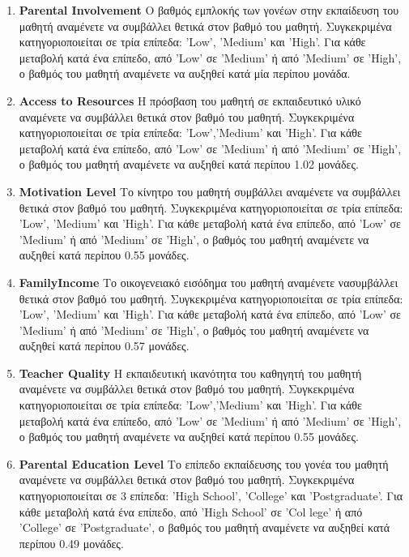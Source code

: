 \documentclass[12pt]{article}
\begin{document}
\begin{enumerate}
    \item \textbf{Parental Involvement} Ο βαθμός εμπλοκής των γονέων στην εκπαίδευση του μαθητή αναμένετε
 να συμβάλλει θετικά στον βαθμό του μαθητή. Συγκεκριμένα κατηγοριοποιείται σε τρία επίπεδα:
 ’Low’, ’Medium’ και ’High’. Για κάθε μεταβολή κατά ένα επίπεδο, από ’Low’ σε ’Medium’ ή
 από ’Medium’ σε ’High’, ο βαθμός του μαθητή αναμένετε να αυξηθεί κατά μία περίπου μονάδα.
 
 	\item \textbf{Access to Resources} Η πρόσβαση του μαθητή σε εκπαιδευτικό υλικό αναμένετε να συμβάλλει
 θετικά στον βαθμό του μαθητή. Συγκεκριμένα κατηγοριοποιείται σε τρία επίπεδα: ’Low’,’Medium’
 και ’High’. Για κάθε μεταβολή κατά ένα επίπεδο, από ’Low’ σε ’Medium’ ή από ’Medium’ σε
 ’High’, ο βαθμός του μαθητή αναμένετε να αυξηθεί κατά περίπου 1.02 μονάδες.
 
 \item \textbf{Motivation Level} Το κίνητρο του μαθητή συμβάλλει αναμένετε να συμβάλλει θετικά στον βαθμό
 του μαθητή. Συγκεκριμένα κατηγοριοποιείται σε τρία επίπεδα: ’Low’, ’Medium’ και ’High’. Για
 κάθε μεταβολή κατά ένα επίπεδο, από ’Low’ σε ’Medium’ ή από ’Medium’ σε ’High’, ο βαθμός
 του μαθητή αναμένετε να αυξηθεί κατά περίπου 0.55 μονάδες.
 
 \item \textbf{FamilyIncome} Το οικογενειακό εισόδημα του μαθητή αναμένετε νασυμβάλλει θετικά στον βαθμό
 του μαθητή. Συγκεκριμένα κατηγοριοποιείται σε τρία επίπεδα: ’Low’, ’Medium’ και ’High’. Για
 κάθε μεταβολή κατά ένα επίπεδο, από ’Low’ σε ’Medium’ ή από ’Medium’ σε ’High’, ο βαθμός
 του μαθητή αναμένετε να αυξηθεί κατά περίπου 0.57 μονάδες.
 
 \item \textbf{Teacher Quality} Η εκπαιδευτική ικανότητα του καθηγητή του μαθητή αναμένετε να συμβάλλει
 θετικά στον βαθμό του μαθητή. Συγκεκριμένα κατηγοριοποιείται σε τρία επίπεδα: ’Low’,’Medium’
 και ’High’. Για κάθε μεταβολή κατά ένα επίπεδο, από ’Low’ σε ’Medium’ ή από ’Medium’ σε
 ’High’, ο βαθμός του μαθητή αναμένετε να αυξηθεί κατά περίπου 0.55 μονάδες.
 
 \item \textbf{Parental Education Level} Το επίπεδο εκπαίδευσης του γονέα του μαθητή αναμένετε να συμβάλλει
 θετικά στον βαθμό του μαθητή. Συγκεκριμένα κατηγοριοποιείται σε 3 επίπεδα: ’High School’,
 ’College’ και ’Postgraduate’. Για κάθε μεταβολή κατά ένα επίπεδο, από ’High School’ σε ’Col
lege’ ή από ’College’ σε ’Postgraduate’, ο βαθμός του μαθητή αναμένετε να αυξηθεί κατά περίπου
 0.49 μονάδες.
 

\end{enumerate}
\end{document}
